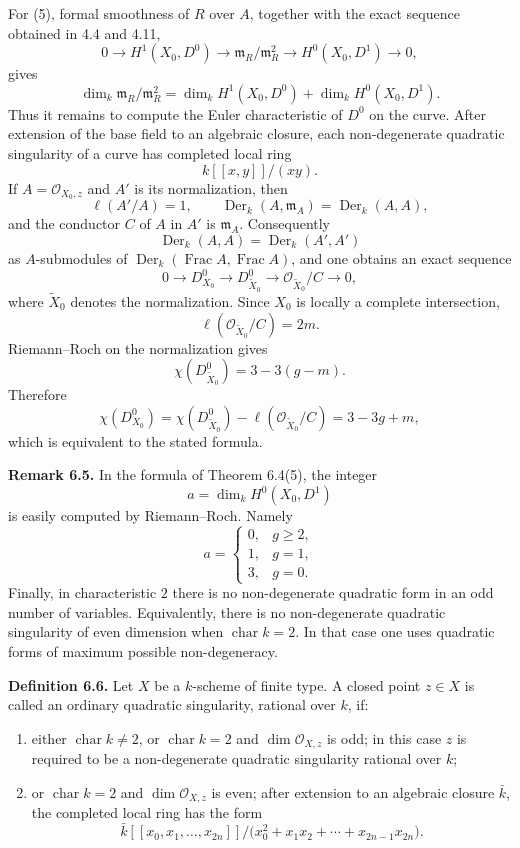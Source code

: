\documentclass[11pt]{article}
\providecommand{\Der}{\operatorname{Der}}
\providecommand{\Frac}{\operatorname{Frac}}
\providecommand{\Oo}{\mathcal O}
\begin{document}
For (5), formal smoothness of \(R\) over \(A\), together with the exact sequence obtained in 4.4 and 4.11,
\[
        0\to H^1(X_0,D^0)\to \mathfrak m_R/\mathfrak m_R^2
        \to H^0(X_0,D^1)\to 0,
\]
gives
\[
        \dim_k\mathfrak m_R/\mathfrak m_R^2
        =
        \dim_k H^1(X_0,D^0)+\dim_kH^0(X_0,D^1).
\]
Thus it remains to compute the Euler characteristic of \(D^0\) on the curve.  After extension of the base field to an algebraic closure, each non-degenerate quadratic singularity of a curve has completed local ring
\[
        k[[x,y]]/(xy).
\]
If \(A=\Oo_{X_0,z}\) and \(A'\) is its normalization, then
\[
        \ell(A'/A)=1,\qquad
        \Der_k(A,\mathfrak m_A)=\Der_k(A,A),
\]
and the conductor \(C\) of \(A\) in \(A'\) is \(\mathfrak m_A\).  Consequently
\[
        \Der_k(A,A)=\Der_k(A',A')
\]
as \(A\)-submodules of \(\Der_k(\Frac A,\Frac A)\), and one obtains an exact sequence
\[
        0\to D^0_{X_0}
        \to D^0_{\widetilde X_0}
        \to \Oo_{\widetilde X_0}/C
        \to 0,
\]
where \(\widetilde X_0\) denotes the normalization.  Since \(X_0\) is locally a complete intersection,
\[
        \ell(\Oo_{\widetilde X_0}/C)=2m.
\]
Riemann--Roch on the normalization gives
\[
        \chi(D^0_{\widetilde X_0})=3-3(g-m).
\]
Therefore
\[
        \chi(D^0_{X_0})
        =
        \chi(D^0_{\widetilde X_0})-\ell(\Oo_{\widetilde X_0}/C)
        =
        3-3g+m,
\]
which is equivalent to the stated formula.

\textbf{Remark 6.5.}  In the formula of Theorem 6.4(5), the integer
\[
        a=\dim_k H^0(X_0,D^1)
\]
is easily computed by Riemann--Roch.  Namely
\[
        a=
        \begin{cases}
        0,& g\geq 2,\\
        1,& g=1,\\
        3,& g=0.
        \end{cases}
\]
Finally, in characteristic \(2\) there is no non-degenerate quadratic form in an odd number of variables.  Equivalently, there is no non-degenerate quadratic singularity of even dimension when \(\operatorname{char}k=2\).  In that case one uses quadratic forms of maximum possible non-degeneracy.

\textbf{Definition 6.6.}  Let \(X\) be a \(k\)-scheme of finite type.  A closed point \(z\in X\) is called an ordinary quadratic singularity, rational over \(k\), if:
\begin{enumerate}[label=(\roman*)]
\item either \(\operatorname{char}k\neq 2\), or \(\operatorname{char}k=2\) and \(\dim\Oo_{X,z}\) is odd; in this case \(z\) is required to be a non-degenerate quadratic singularity rational over \(k\);
\item or \(\operatorname{char}k=2\) and \(\dim\Oo_{X,z}\) is even; after extension to an algebraic closure \(\bar k\), the completed local ring has the form
\[
        \bar k[[x_0,x_1,\ldots,x_{2n}]]
        /\bigl(x_0^2+x_1x_2+\cdots+x_{2n-1}x_{2n}\bigr).
\]
\end{enumerate}
\end{document}
